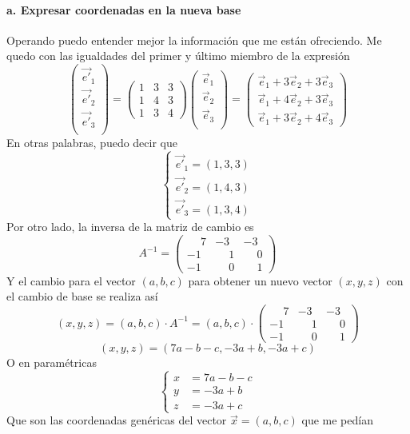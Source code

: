 \begin{problema}{\cite[8p345]{palacios}}
	\paragraph{a. Expresar coordenadas en la nueva base} Operando puedo entender mejor 
	la información que me están ofreciendo. Me quedo con las
	igualdades del primer y último miembro de la expresión
	$$\begin{pmatrix}
		\vec{e'}_1 \\
		\vec{e'}_2 \\
		\vec{e'}_3 \\
	\end{pmatrix}
	=
	\begin{pmatrix}
		1 & 3 & 3 \\
		1 & 4 & 3 \\
		1 & 3 & 4
	\end{pmatrix}
	\begin{pmatrix}
		\vec{e}_1 \\
		\vec{e}_2 \\
		\vec{e}_3 \\
	\end{pmatrix}
	=
	\begin{pmatrix}
		\vec{e}_1+3\vec{e}_2+3\vec{e}_3 \\
		\vec{e}_1+4\vec{e}_2+3\vec{e}_3 \\
		\vec{e}_1+3\vec{e}_2+4\vec{e}_3
	\end{pmatrix}
	$$
	En otras palabras, puedo decir que
	$$
	\begin{cases}
		\vec{e'}_1=(1,3,3) \\
		\vec{e'}_2=(1,4,3) \\
		\vec{e'}_3=(1,3,4)
	\end{cases}
	$$
	Por otro lado, la inversa de la matriz de cambio es
	$$A^{-1}=
	\begin{pmatrix}
		\phantom{-}7 & -3 & -3 \\
		-1 & \phantom{-}1 & \phantom{-}0 \\
		-1 & \phantom{-}0 & \phantom{-}1
	\end{pmatrix}
	$$
	Y el cambio para el vector $(a,b,c)$ para obtener un nuevo vector $(x,y,z)$ con el cambio de
	base se realiza así
	$$
	(x,y,z)=(a,b,c)\cdot A^{-1}=
	(a,b,c) \cdot
	\begin{pmatrix}
		\phantom{-}7 & -3 & -3 \\
		-1 & \phantom{-}1 & \phantom{-}0 \\
		-1 & \phantom{-}0 & \phantom{-}1
	\end{pmatrix}
	$$
	$$(x,y,z)=(7a-b-c, -3a+b, -3a+c)$$
	O en paramétricas
	$$
	\begin{cases}
		x &= 7a-b-c\\
		y &= -3a+b\\
		z &= -3a+c
	\end{cases}
	$$
	Que son las coordenadas genéricas del vector $\vec{x}=(a,b,c)$ que me pedían


\end{problema}
